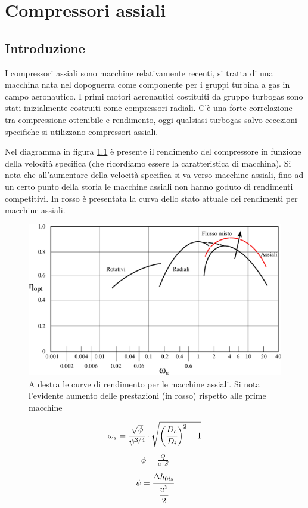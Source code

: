 \chapter{Compressori assiali}

\section{Introduzione}
I compressori assiali sono macchine relativamente recenti, si tratta di una macchina nata nel dopoguerra come componente per i gruppi turbina a gas in campo aeronautico. I primi motori aeronautici costituiti da gruppo turbogas sono stati inizialmente costruiti come compressori radiali. C'è una forte correlazione tra compressione ottenibile e rendimento, oggi qualsiasi turbogas salvo eccezioni specifiche si utilizzano compressori assiali. 

Nel diagramma in figura \ref{fig:PrestComp} è presente il rendimento del compressore in funzione della velocità specifica (che ricordiamo essere la caratteristica di macchina). Si nota che all'aumentare della velocità specifica si va verso macchine assiali, fino ad un certo punto della storia le macchine assiali non hanno goduto di rendimenti competitivi. In rosso è presentata la curva dello stato attuale dei rendimenti per macchine assiali. 
\begin{figure}
\centering
  \includegraphics[width=.8\textwidth]{fig/PrestComp.pdf}
\caption{A destra le curve di rendimento per le macchine assiali. Si nota l'evidente aumento delle prestazioni (in rosso) rispetto alle prime macchine}
\label{fig:PrestComp}
\end{figure}
\begin{align*}
\omega_s = \cfrac{\sqrt{\phi}}{\psi^{3/4}} \cdot \sqrt{\bigg( \cfrac{D_e}{D_i} \bigg)^2 -1}
\end{align*}
\begin{align*}
\phi = \frac{Q}{u \cdot S}
\end{align*}
\begin{align*}
\psi = \cfrac{\Delta h_{0is}}{\cfrac{u^2}{2}}
\end{align*}

